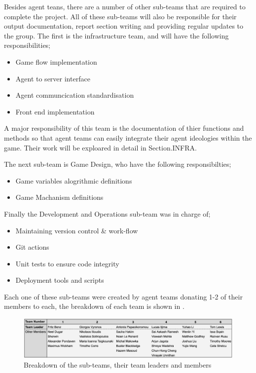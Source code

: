 Besides agent teans, there are a number of other sub-teams that are required to complete the project. All of these sub-teams will also be responsible for their output documentation, report section writing and providing regular updates to the group. 
The first is the infrastructure team, and will have the following responsibilities;

\begin{itemize}
    \item Game flow implementation
    \item Agent to server interface
    \item Agent communcication standardisation
    \item Front end implementation
\end{itemize}

A major responsibility of this team is the documentation of thier functions and methods so that agent teams can easily integrate their agent ideologies within the game. Their work will be exploared in detail in Section.INFRA.

The next sub-team is Game Design, who have the following responsibilties;

\begin{itemize}
    \item Game variables alogrithmic definitions
    \item Game Machanism definitions 
\end{itemize}

Finally the Development and Operations sub-team was in charge of;

\begin{itemize}
    \item Maintaining version control \& work-flow
    \item Git actions
    \item Unit tests to ensure code integrity
    \item Deployment tools and scripts
\end{itemize}

Each one of these sub-teams were created by agent teams donating 1-2 of their members to each, the breakdown of each team is shown in .

\begin{figure}[htb]
    \centering
    \includegraphics{000_introduction/images/subteams.png}
    \caption{Breakdown of the sub-teams, their team leaders and members}
    \label{fig:subteams}
\end{figure}

